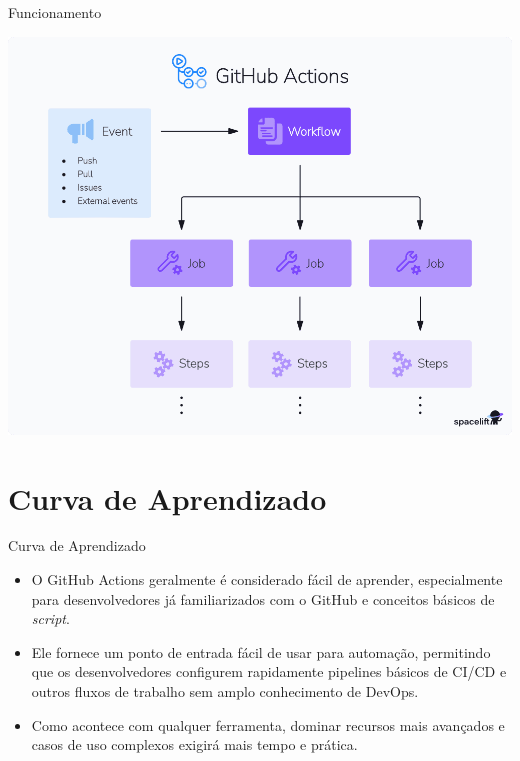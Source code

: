 \documentclass[t,serif]{beamer}
\begin{document}
	\begin{frame}{Funcionamento}
		\begin{center}
			\includegraphics[width=0.8\linewidth]{figs/3_1.png}
		\end{center}
	\end{frame}
	
\section{Curva de Aprendizado}
	\begin{frame}{Curva de Aprendizado}
		\vspace{0.5cm}
		\begin{itemize}
			\item O GitHub Actions geralmente é considerado fácil de aprender, especialmente para desenvolvedores já familiarizados com o GitHub e conceitos básicos de \textit{script}.
			\vspace{0.5cm}
			\item Ele fornece um ponto de entrada fácil de usar para automação, permitindo que os desenvolvedores configurem rapidamente pipelines básicos de CI/CD e outros fluxos de trabalho sem amplo conhecimento de DevOps.
			\vspace{0.5cm}
			\item Como acontece com qualquer ferramenta, dominar recursos mais avançados e casos de uso complexos exigirá mais tempo e prática.
		\end{itemize}
	\end{frame}
	
\end{document}
